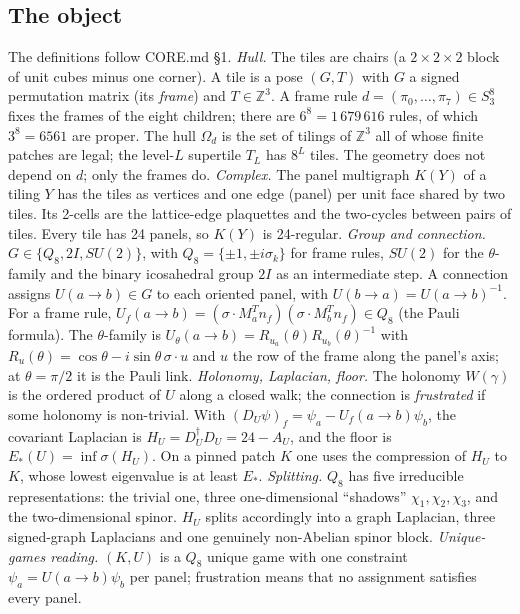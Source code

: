 \documentclass[11pt]{article}
\begin{document}
\subsection{The object}
The definitions follow CORE.md \S1.
\emph{Hull.} The tiles are chairs (a $2\times2\times2$ block of unit cubes minus one corner). A tile is a pose $(G,T)$ with $G$ a signed permutation matrix (its \emph{frame}) and $T\in\mathbb{Z}^3$. A frame rule $d=(\pi_0,\ldots,\pi_7)\in S_3^8$ fixes the frames of the eight children; there are $6^8=1\,679\,616$ rules, of which $3^8=6561$ are proper. The hull $\Omega_d$ is the set of tilings of $\mathbb{Z}^3$ all of whose finite patches are legal; the level-$L$ supertile $T_L$ has $8^L$ tiles. The geometry does not depend on $d$; only the frames do.
\emph{Complex.} The panel multigraph $K(Y)$ of a tiling $Y$ has the tiles as vertices and one edge (panel) per unit face shared by two tiles. Its 2-cells are the lattice-edge plaquettes and the two-cycles between pairs of tiles. Every tile has 24 panels, so $K(Y)$ is 24-regular.
\emph{Group and connection.} $G\in\{Q_8,2I,SU(2)\}$, with $Q_8=\{\pm1,\pm i\sigma_k\}$ for frame rules, $SU(2)$ for the $\theta$-family and the binary icosahedral group $2I$ as an intermediate step. A connection assigns $U(a\to b)\in G$ to each oriented panel, with $U(b\to a)=U(a\to b)^{-1}$. For a frame rule, $U_f(a\to b)=(\sigma\cdot M_a^{T}n_f)(\sigma\cdot M_b^{T}n_f)\in Q_8$ (the Pauli formula). The $\theta$-family is $U_\theta(a\to b)=R_{u_a}(\theta)R_{u_b}(\theta)^{-1}$ with $R_u(\theta)=\cos\theta-i\sin\theta\,\sigma\cdot u$ and $u$ the row of the frame along the panel's axis; at $\theta=\pi/2$ it is the Pauli link.
\emph{Holonomy, Laplacian, floor.} The holonomy $W(\gamma)$ is the ordered product of $U$ along a closed walk; the connection is \emph{frustrated} if some holonomy is non-trivial. With $(D_U\psi)_f=\psi_a-U_f(a\to b)\psi_b$, the covariant Laplacian is $H_U=D_U^\dagger D_U=24-A_U$, and the floor is $E_*(U)=\inf\sigma(H_U)$. On a pinned patch $K$ one uses the compression of $H_U$ to $K$, whose lowest eigenvalue is at least $E_*$.
\emph{Splitting.} $Q_8$ has five irreducible representations: the trivial one, three one-dimensional ``shadows'' $\chi_1,\chi_2,\chi_3$, and the two-dimensional spinor. $H_U$ splits accordingly into a graph Laplacian, three signed-graph Laplacians and one genuinely non-Abelian spinor block.
\emph{Unique-games reading.} $(K,U)$ is a $Q_8$ unique game with one constraint $\psi_a=U(a\to b)\psi_b$ per panel; frustration means that no assignment satisfies every panel.
\end{document}
